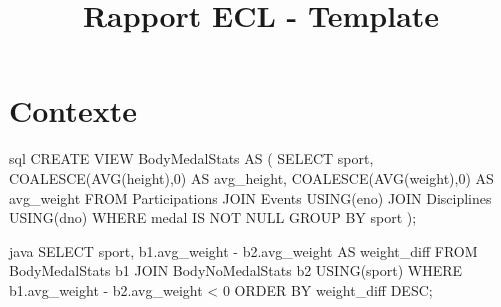 \documentclass{mytex}
\title{Rapport ECL - Template} %
\begin{document}
	
	
	
	
	
	
	\fairemarges %
	\fairepagedegarde %
	\tabledematieres %
	
	
	\section{Contexte} 


	
	\begin{codeboxlang}[title=Physique des médaillés par sport]{sql}
		CREATE VIEW BodyMedalStats AS (
		SELECT sport, COALESCE(AVG(height),0) AS avg_height, COALESCE(AVG(weight),0) AS avg_weight
		FROM Participations
		JOIN Events USING(eno)
		JOIN Disciplines USING(dno)
		WHERE medal IS NOT NULL
		GROUP BY sport
		);
	\end{codeboxlang}
	
	
	
	\begin{codeboxlang}[title=Le code java !]{java}
		SELECT sport, b1.avg_weight - b2.avg_weight AS weight_diff
		FROM BodyMedalStats b1
		JOIN BodyNoMedalStats b2 USING(sport) 
		WHERE b1.avg_weight - b2.avg_weight < 0
		ORDER BY weight_diff DESC;
	\end{codeboxlang}
	
	\merci
	
\end{document}
